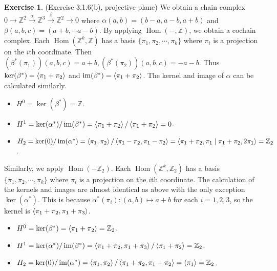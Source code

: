 \documentclass[12pt, psamsfonts]{amsart}
\theoremstyle{definition}
\newtheorem*{exer}{Exercise}
\theoremstyle{remark}
\DeclareMathOperator{\Hom}{Hom}
\DeclareMathOperator{\Hom}{Hom}
\DeclareMathOperator{\im}{im}
\numberwithin{equation}{section}
\begin{document}
\begin{exer}{(Exercise 3.1.6(b), projective plane)}
  We obtain a chain complex $0 \rightarrow \mathbb{Z}^2 \xrightarrow{\alpha} \mathbb{Z}^3 \xrightarrow{\beta} \mathbb{Z}^2 \rightarrow 0$ where $\alpha(a, b) = (b - a, a - b, a + b)$ and $\beta(a, b, c) = (a + b, -a - b)$.
  By applying $\Hom(-, \mathbb{Z})$, we obtain a cochain complex.
  Each $\Hom(\mathbb{Z}^k, \mathbb{Z})$ has a basis $\{ \pi_1, \pi_2, \cdots, \pi_k \}$ where $\pi_i$ is a projection on the $i$th coordinate.
  Then $(\beta^{\ast}(\pi_1))(a, b, c) = a + b, (\beta^{\ast}(\pi_2))(a, b, c) = -a - b$.
  Thus $\ker(\beta^{\ast}) = \ev{ \pi_1 + \pi_2 }$ and $\im(\beta^{\ast}) = \ev{\pi_1 + \pi_2}$.
  The kernel and image of $\alpha$ can be calculated similarly.
  \begin{itemize}
    \item
      $H^0 = \ker(\beta^{\ast}) = \mathbb{Z}$.
    \item
      $H^1 = \ker(\alpha^{\ast}) / \im(\beta^{\ast}) = \ev{\pi_1 + \pi_2} / \ev{\pi_1 + \pi_2} = 0$.
    \item
      $H_2 = \ker(0) / \im(\alpha^{\ast}) = \ev{\pi_1, \pi_2} / \ev{\pi_1 - \pi_2, \pi_1 - \pi_2} = \ev{\pi_1 + \pi_2, \pi_1 \mid \pi_1 + \pi_2, 2\pi_1} = \mathbb{Z}_2$.
  \end{itemize}

  Similarly, we apply $\Hom(-\mathbb{Z}_2)$.
  Each $\Hom(\mathbb{Z}^k, \mathbb{Z}_2)$ has a basis $\{ \pi_1, \pi_2, \cdots, \pi_k \}$ where $\pi_i$ is a projection on the $i$th coordinate.
  The calculation of the kernels and images are almost identical as above with the only exception $\ker(\alpha^{\ast})$.
  This is because $\alpha^{\ast}(\pi_i) : (a, b) \mapsto a + b$ for each $i = 1, 2, 3$, so the kernel is $\ev{ \pi_1 + \pi_2, \pi_1 + \pi_3 }$.
  \begin{itemize}
    \item
      $H^0 = \ker(\beta^{\ast}) = \ev{\pi_1 + \pi_2} = \mathbb{Z}_2$.
    \item
      $H^1 = \ker(\alpha^{\ast}) / \im(\beta^{\ast}) = \ev{\pi_1 + \pi_2, \pi_1 + \pi_3} / \ev{\pi_1 + \pi_2} = \mathbb{Z}_2$.
    \item
      $H_2 = \ker(0) / \im(\alpha^{\ast}) = \ev{\pi_1, \pi_2} / \ev{\pi_1 + \pi_2, \pi_1 + \pi_2} = \ev{\pi_1} = \mathbb{Z}_2$.
  \end{itemize}

\end{exer}
\end{document}

